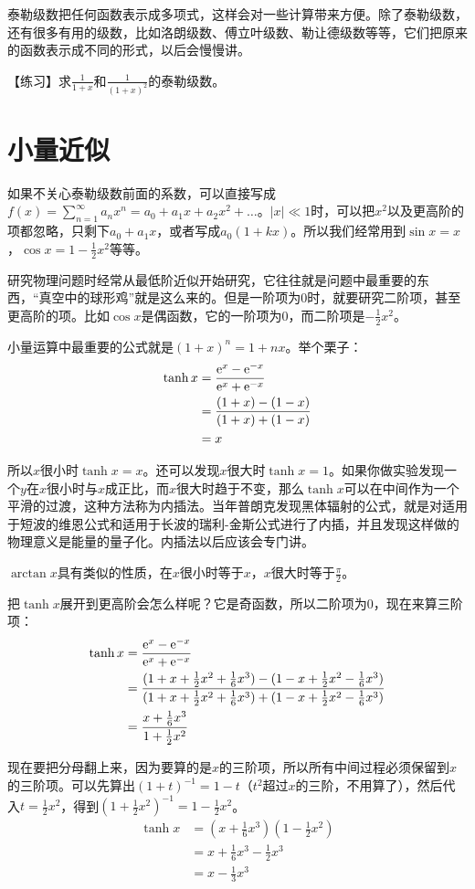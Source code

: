 泰勒级数把任何函数表示成多项式，这样会对一些计算带来方便。除了泰勒级数，还有很多有用的级数，比如洛朗级数、傅立叶级数、勒让德级数等等，它们把原来的函数表示成不同的形式，以后会慢慢讲。

【练习】求$\frac{1}{1+x}$和$\frac{1}{(1+x)^2}$的泰勒级数。
\section{小量近似}
如果不关心泰勒级数前面的系数，可以直接写成$f(x)=\sum_{n=1}^{\infty} a_n x^n=a_0+a_1 x+a_2 x^2+\dots$。$|x| \ll 1$时，可以把$x^2$以及更高阶的项都忽略，只剩下$a_0+a_1 x$，或者写成$a_0(1+k x)$。所以我们经常用到$\sin x=x$，$\cos x=1- \frac{1}{2}x^2$等等。

研究物理问题时经常从最低阶近似开始研究，它往往就是问题中最重要的东西，“真空中的球形鸡”就是这么来的。但是一阶项为$0$时，就要研究二阶项，甚至更高阶的项。比如$\cos x$是偶函数，它的一阶项为$0$，而二阶项是$-\frac{1}{2} x^2$。

小量运算中最重要的公式就是$(1+x)^n=1+n x$。举个栗子：
\begin{align*}
\tanh x&=\frac{\mathrm{e}^x-\mathrm{e}^{-x}}{\mathrm{e}^x+\mathrm{e}^{-x}} \\
&=\frac{(1+x)-(1-x)}{(1+x)+(1-x)} \\
&=x
\end{align*}

所以$x$很小时$\tanh x=x$。还可以发现$x$很大时$\tanh x=1$。如果你做实验发现一个$y$在$x$很小时与$x$成正比，而$x$很大时趋于不变，那么$\tanh x$可以在中间作为一个平滑的过渡，这种方法称为内插法。当年普朗克发现黑体辐射的公式，就是对适用于短波的维恩公式和适用于长波的瑞利-金斯公式进行了内插，并且发现这样做的物理意义是能量的量子化。内插法以后应该会专门讲。

$\arctan x$具有类似的性质，在$x$很小时等于$x$，$x$很大时等于$\frac{\pi}{2}$。

把$\tanh x$展开到更高阶会怎么样呢？它是奇函数，所以二阶项为$0$，现在来算三阶项：
\begin{align*}
\tanh x&=\frac{\mathrm{e}^x-\mathrm{e}^{-x}}{\mathrm{e}^x+\mathrm{e}^{-x}} \\
&=\frac{(1+x+\frac{1}{2} x^2+\frac{1}{6} x^3)-(1-x+\frac{1}{2} x^2-\frac{1}{6} x^3)}{(1+x+\frac{1}{2} x^2+\frac{1}{6} x^3)+(1-x+\frac{1}{2} x^2-\frac{1}{6} x^3)} \\
&=\frac{x+\frac{1}{6} x^3}{1+\frac{1}{2} x^2}
\end{align*}

现在要把分母翻上来，因为要算的是$x$的三阶项，所以所有中间过程必须保留到$x$的三阶项。可以先算出$(1+t)^{-1}=1-t$（$t^2$超过$x$的三阶，不用算了），然后代入$t=\frac{1}{2} x^2$，得到$(1+\frac{1}{2} x^2)^{-1}=1-\frac{1}{2} x^2$。
\begin{align*}
\tanh x&=(x+\frac{1}{6} x^3)(1-\frac{1}{2} x^2) \\
&=x+\frac{1}{6} x^3-\frac{1}{2} x^3 \\
&=x-\frac{1}{3} x^3
\end{align*}


